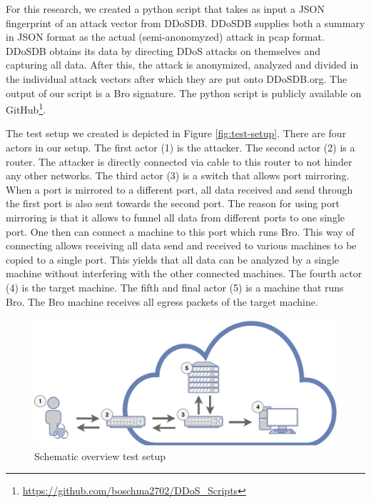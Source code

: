 For this research, we created a python script that takes as input a JSON fingerprint of an attack vector from DDoSDB. DDoSDB supplies both a summary in JSON format as the actual (semi-anonomyzed) attack in pcap format. DDoSDB obtains its data by directing DDoS attacks on themselves and capturing all data. After this, the attack is anonymized, analyzed and divided in the individual attack vectors after which they are put onto DDoSDB.org. The output of our script is a Bro signature. The python script is publicly available on GitHub\footnote{\url{https://github.com/boschma2702/DDoS_Scripts}}. 

The test setup we created is depicted in Figure \ref{fig:test-setup}. There are four actors in our setup. The first actor (1) is the attacker. The second actor (2) is a router. The attacker is directly connected via cable to this router to not hinder any other networks. The third actor (3) is a switch that allows port mirroring. When a port is mirrored to a different port, all data received and send through the first port is also sent towards the second port. The reason for using port mirroring is that it allows to funnel all data from different ports to one single port. One then can connect a machine to this port which runs Bro. This way of connecting allows receiving all data send and received to various machines to be copied to a single port. This yields that all data can be analyzed by a single machine without interfering with the other connected machines. The fourth actor (4) is the target machine. The fifth and final actor (5) is a machine that runs Bro. The Bro machine receives all egress packets of the target machine. 


\begin{figure}[H]
\centering
\includegraphics[width=\textwidth]{./images/test-setup.pdf}
\caption{Schematic overview test setup}
\end{figure}\label{fig:test-setup}

